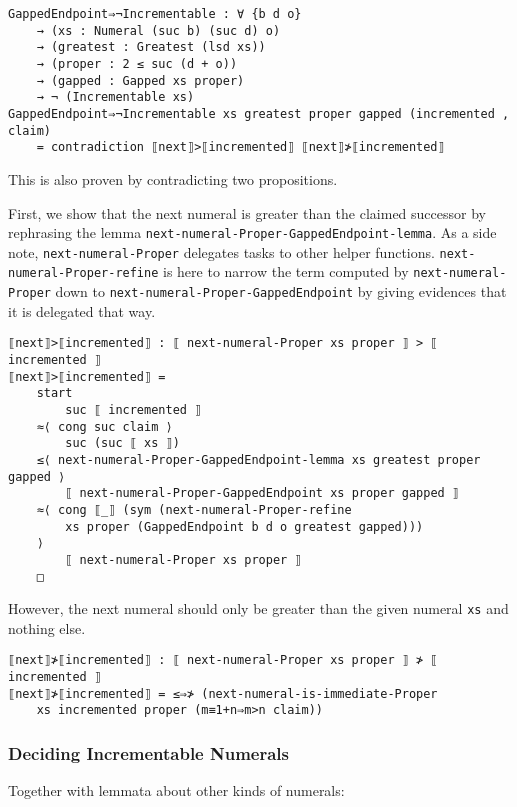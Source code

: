 \documentclass[\main/thesis.tex]{subfiles}
\begin{document}
\begin{lstlisting}[basicstyle=\ttfamily\scriptsize]
GappedEndpoint⇒¬Incrementable : ∀ {b d o}
    → (xs : Numeral (suc b) (suc d) o)
    → (greatest : Greatest (lsd xs))
    → (proper : 2 ≤ suc (d + o))
    → (gapped : Gapped xs proper)
    → ¬ (Incrementable xs)
GappedEndpoint⇒¬Incrementable xs greatest proper gapped (incremented , claim)
    = contradiction ⟦next⟧>⟦incremented⟧ ⟦next⟧≯⟦incremented⟧
\end{lstlisting}

This is also proven by contradicting two propositions.

First, we show that the next numeral is greater than the claimed successor
by rephrasing the lemma \lstinline|next-numeral-Proper-GappedEndpoint-lemma|.
As a side note, \lstinline|next-numeral-Proper| delegates tasks to other helper
functions. \lstinline|next-numeral-Proper-refine| is here to narrow the term
computed by \lstinline|next-numeral-Proper| down to
\lstinline|next-numeral-Proper-GappedEndpoint|
by giving evidences that it is delegated that way.

\begin{lstlisting}[basicstyle=\ttfamily\scriptsize]
⟦next⟧>⟦incremented⟧ : ⟦ next-numeral-Proper xs proper ⟧ > ⟦ incremented ⟧
⟦next⟧>⟦incremented⟧ =
    start
        suc ⟦ incremented ⟧
    ≈⟨ cong suc claim ⟩
        suc (suc ⟦ xs ⟧)
    ≤⟨ next-numeral-Proper-GappedEndpoint-lemma xs greatest proper gapped ⟩
        ⟦ next-numeral-Proper-GappedEndpoint xs proper gapped ⟧
    ≈⟨ cong ⟦_⟧ (sym (next-numeral-Proper-refine
        xs proper (GappedEndpoint b d o greatest gapped)))
    ⟩
        ⟦ next-numeral-Proper xs proper ⟧
    □
\end{lstlisting}

However, the next numeral should only be greater than the given numeral
\lstinline|xs| and nothing else.

\begin{lstlisting}[basicstyle=\ttfamily\scriptsize]
⟦next⟧≯⟦incremented⟧ : ⟦ next-numeral-Proper xs proper ⟧ ≯ ⟦ incremented ⟧
⟦next⟧≯⟦incremented⟧ = ≤⇒≯ (next-numeral-is-immediate-Proper
    xs incremented proper (m≡1+n⇒m>n claim))
\end{lstlisting}

\subsubsection{Deciding Incrementable Numerals}

Together with lemmata about other kinds of numerals:
\end{document}
